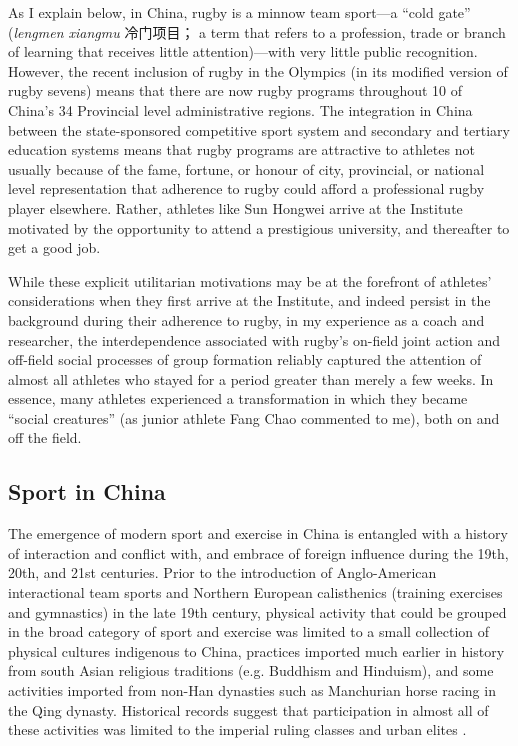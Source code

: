 \begin{CJK}{UTF8}{gbsn}
 As I explain below, in China, rugby is a minnow team sport---a ``cold gate'' (\textit{lengmen xiangmu} 冷门项目； a term that refers to a profession, trade or branch of learning that receives little attention)---with very little public recognition.  However, the recent inclusion of rugby in the Olympics (in its modified version of rugby sevens) means that there are now rugby programs throughout 10 of China's 34 Provincial level administrative regions.  The integration in China between the state-sponsored competitive sport system and secondary and tertiary education systems means that rugby programs are attractive to athletes not usually because of the fame, fortune, or honour of city, provincial, or national level representation that adherence to rugby could afford a professional rugby player elsewhere. Rather, athletes like Sun Hongwei arrive at the Institute motivated by the opportunity to attend a prestigious university, and thereafter to get a good job.

 While these explicit utilitarian motivations may be at the forefront of athletes' considerations when they first arrive at the Institute, and indeed persist in the background during their adherence to rugby, in my experience as a coach and researcher, the interdependence associated with rugby's on-field joint action and off-field social processes of group formation reliably captured the attention of almost all athletes who stayed for a period greater than merely a few weeks. In essence, many athletes experienced a transformation in which they became ``social creatures'' (as junior athlete Fang Chao commented to me), both on and off the field.


 \subsection{Sport in China}
 The emergence of modern sport and exercise in China is entangled with a history of interaction and conflict with, and embrace of foreign influence during the 19th, 20th, and 21st centuries.
 Prior to the introduction of Anglo-American interactional team sports and Northern European calisthenics (training exercises and gymnastics) in the late 19th century, physical activity that could be grouped in the broad category of sport and exercise was limited to a small collection of physical cultures indigenous to China, practices imported much earlier in history from south Asian religious traditions (e.g. Buddhism and Hinduism), and some activities imported from non-Han dynasties such as Manchurian horse racing in the Qing dynasty.  Historical records suggest that participation in almost all of these activities was limited to the imperial ruling classes and urban elites \citep{Ge2005}.


\end{CJK}
